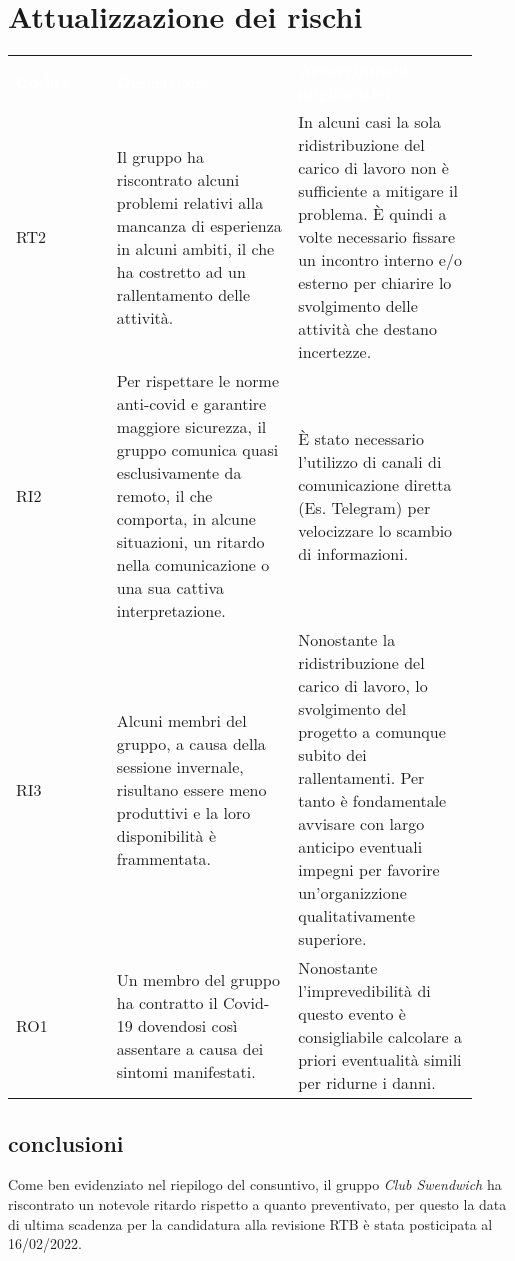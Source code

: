 \section{Attualizzazione dei rischi}
\label{sec:AttualizzazioneRischi}

{\renewcommand{\arraystretch}{1.5} \small
\begin{tabular}{ >{\centering}p{0.20\linewidth} | >{\centering}p{0.36\linewidth} | >{\centering}p{0.36\linewidth}}
	\rowcolor[RGB]{33, 73, 50}
	\textcolor{white}{\textbf{Codice}} & \textcolor{white}
	{\textbf{Descrizione}} & \textcolor{white}{\textbf{Accorginmenti migliorativi}}\tabularnewline
	\rowcolor[RGB]{216, 235, 171}
	RT2
    & Il gruppo ha riscontrato alcuni problemi relativi alla mancanza di esperienza in alcuni ambiti, il che ha costretto ad un rallentamento delle attività.  
    & In alcuni casi la sola ridistribuzione del carico di lavoro non è sufficiente a mitigare il problema. È quindi a volte necessario fissare un incontro interno e/o esterno per chiarire lo svolgimento delle attività che destano incertezze.   \tabularnewline
    \rowcolor[RGB]{233, 245, 206}
	RI2
    & Per rispettare le norme anti-covid e garantire maggiore sicurezza, il gruppo comunica quasi esclusivamente da remoto, il che comporta, in alcune situazioni, un ritardo nella comunicazione o una sua cattiva interpretazione.
    & È stato necessario l'utilizzo di canali di comunicazione diretta (Es. Telegram) per velocizzare lo scambio di informazioni. \tabularnewline
    \rowcolor[RGB]{216, 235, 171}
    RI3
	& Alcuni membri del gruppo, a causa della sessione invernale, risultano essere meno produttivi e la loro disponibilità è frammentata. 
    & Nonostante la ridistribuzione del carico di lavoro, lo svolgimento del progetto a comunque subito dei rallentamenti. Per tanto è fondamentale avvisare con largo anticipo eventuali impegni per favorire un'organizzione qualitativamente superiore.  \tabularnewline
	\rowcolor[RGB]{233, 245, 206}
    RO1
	& Un membro del gruppo ha contratto il Covid-19 dovendosi così assentare a causa dei sintomi manifestati.
    & Nonostante l'imprevedibilità di questo evento è consigliabile calcolare a priori eventualità simili per ridurne i danni.   \tabularnewline
\end{tabular}	
}

\subsection{conclusioni}
Come ben evidenziato nel riepilogo del consuntivo, il gruppo \textit{Club Swendwich} ha riscontrato un notevole ritardo rispetto a quanto preventivato, per questo la data di ultima scadenza 
per la candidatura alla revisione RTB è stata posticipata al 16/02/2022.
